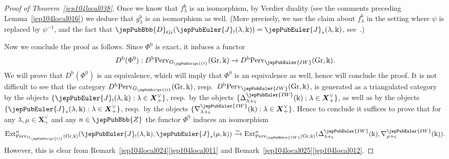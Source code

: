\begin{proof}[Proof of Theorem~{\rm \ref{jep104local038}}]
Once we know that $f_\lambda^\Bbbk$ is an isomorphism, by Verdier duality (see the comments preceding Lemma~\ref{jep104local016}) we deduce that $g_\lambda^\Bbbk$ is an isomorphism as well. (More precisely, we use the claim about $f_\lambda^\Bbbk$ in the setting where $\psi$ is replaced by $\psi^{-1}$, and the fact that $\jepPubBbb{D}_{\mathrm{Gr}}(\jepPubEuler{J}_!(\lambda,\Bbbk)) = \jepPubEuler{J}_*(\lambda,\Bbbk)$, see~\cite[Prop.~8.1(c)]{jep104ref36}.)

Now we
conclude the proof as follows.
Since $\Phi^0$ is exact, it induces a functor
\[
D^{\mathrm{b}}(\Phi^0) : D^{\mathrm{b}} \mathrm{Perv}_{G_{\jepPubScript{O}}}(\mathrm{Gr}, \Bbbk) \to D^{\mathrm{b}} \mathrm{Perv}_{\jepPubEuler{IW}}(\mathrm{Gr}, \Bbbk).
\]
We will prove that $D^{\mathrm{b}}(\Phi^0)$ is an equivalence, which will imply that $\Phi^0$ is an equivalence as well, hence will conclude the proof.
It is not difficult to see that the category $D^{\mathrm{b}} \mathrm{Perv}_{G_{\jepPubScript{O}}}(\mathrm{Gr}, \Bbbk)$, resp.~$D^{\mathrm{b}} \mathrm{Perv}_{\jepPubEuler{IW}}(\mathrm{Gr}, \Bbbk)$, is generated as a triangulated category by the objects $\{\jepPubEuler{J}_!(\lambda,\Bbbk) : \lambda \in \boldsymbol{X}^\vee_+\}$, resp.~by the objects $\{\Delta^{\jepPubEuler{IW}}_{\lambda+\varsigma}(\Bbbk) : \lambda \in \boldsymbol{X}^\vee_+\}$, as well as by the objects $\{\jepPubEuler{J}_*(\lambda,\Bbbk) : \lambda \in \boldsymbol{X}^\vee_+\}$, resp.~by the objects $\{\nabla^{\jepPubEuler{IW}}_{\lambda+\varsigma}(\Bbbk) : \lambda \in \boldsymbol{X}^\vee_+\}$. Hence to conclude it suffices to prove that for any $\lambda,\mu \in \boldsymbol{X}^\vee_+$ and any $n \in \jepPubBbb{Z}$ the functor $\Phi^0$ induces an isomorphism
\[
 \operatorname{Ext}^n_{\mathrm{Perv}_{G_{\jepPubScript{O}}}(\mathrm{Gr}, \Bbbk)}(\jepPubEuler{J}_!(\lambda,\Bbbk), \jepPubEuler{J}_*(\mu,\Bbbk)) \xrightarrow{\sim} \operatorname{Ext}^n_{\mathrm{Perv}_{\jepPubEuler{IW}}(\mathrm{Gr}, \Bbbk)}(\Delta^{\jepPubEuler{IW}}_{\lambda+\varsigma}(\Bbbk), \nabla^{\jepPubEuler{IW}}_{\mu+\varsigma}(\Bbbk)).
\]
However, this is clear from Remark~\ref{jep104local024}\eqref{jep104local011} and Remark~\ref{jep104local025}\eqref{jep104local012}.
\end{proof}

